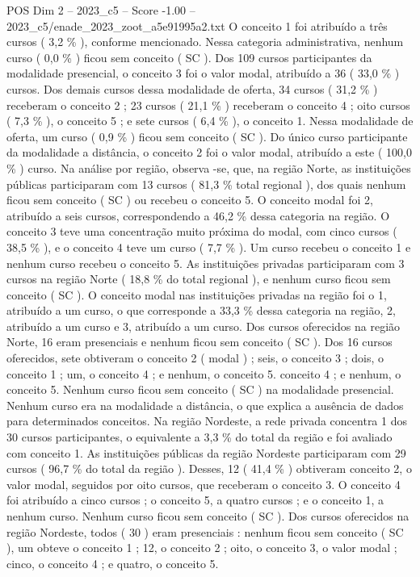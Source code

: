 \begin{textsample}{POS Dim 2 – 2023\_c5 – Score -1.00 – 2023\_c5/enade\_2023\_zoot\_a5e91995a2.txt}
O conceito 1 foi atribuído a três cursos ( 3,2 \% ), conforme mencionado.
Nessa categoria administrativa, nenhum curso ( 0,0 \% ) ficou sem conceito ( SC ).
Dos 109 cursos participantes da modalidade presencial, o conceito 3 foi o valor modal, atribuído a 36 ( 33,0 \% ) cursos.
Dos demais cursos dessa modalidade de oferta, 34 cursos ( 31,2 \% ) receberam o conceito 2 ; 23 cursos ( 21,1 \% ) receberam o conceito 4 ; oito cursos ( 7,3 \% ), o conceito 5 ; e sete cursos ( 6,4 \% ), o conceito 1.
Nessa modalidade de oferta, um curso ( 0,9 \% ) ficou sem conceito ( SC ).
Do único curso participante da modalidade a distância, o conceito 2 foi o valor modal, atribuído a este ( 100,0 \% ) curso.
Na análise por região, observa -se, que, na região Norte, as instituições públicas participaram com 13 cursos ( 81,3 \% total regional ), dos quais nenhum ficou sem conceito ( SC ) ou recebeu o conceito 5.
O conceito modal foi 2, atribuído a seis cursos, correspondendo a 46,2 \% dessa categoria na região.
O conceito 3 teve uma concentração muito próxima do modal, com cinco cursos ( 38,5 \% ), e o conceito 4 teve um curso ( 7,7 \% ).
Um curso recebeu o conceito 1 e nenhum curso recebeu o conceito 5.
As instituições privadas participaram com 3 cursos na região Norte ( 18,8 \% do total regional ), e nenhum curso ficou sem conceito ( SC ).
O conceito modal nas instituições privadas na região foi o 1, atribuído a um curso, o que corresponde a 33,3 \% dessa categoria na região, 2, atribuído a um curso e 3, atribuído a um curso.
Dos cursos oferecidos na região Norte, 16 eram presenciais e nenhum ficou sem conceito ( SC ).
Dos 16 cursos oferecidos, sete obtiveram o conceito 2 ( modal ) ; seis, o conceito 3 ; dois, o conceito 1 ; um, o conceito 4 ; e nenhum, o conceito 5. conceito 4 ; e nenhum, o conceito 5.
Nenhum curso ficou sem conceito ( SC ) na modalidade presencial.
Nenhum curso era na modalidade a distância, o que explica a ausência de dados para determinados conceitos.
Na região Nordeste, a rede privada concentra 1 dos 30 cursos participantes, o equivalente a 3,3 \% do total da região e foi avaliado com conceito 1.
As instituições públicas da região Nordeste participaram com 29 cursos ( 96,7 \% do total da região ).
Desses, 12 ( 41,4 \% ) obtiveram conceito 2, o valor modal, seguidos por oito cursos, que receberam o conceito 3.
O conceito 4 foi atribuído a cinco cursos ; o conceito 5, a quatro cursos ; e o conceito 1, a nenhum curso.
Nenhum curso ficou sem conceito ( SC ).
Dos cursos oferecidos na região Nordeste, todos ( 30 ) eram presenciais : nenhum ficou sem conceito ( SC ), um obteve o conceito 1 ; 12, o conceito 2 ; oito, o conceito 3, o valor modal ; cinco, o conceito 4 ; e quatro, o conceito 5.

\end{textsample}
